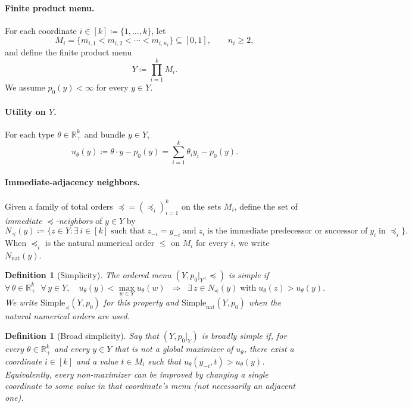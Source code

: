 \documentclass[11pt]{article}
\newtheorem{definition}[theorem]{Definition}
\newcommand{\R}{\mathbb{R}}
\newcommand{\Rp}{\R_+}
\newcommand{\Simplenat}{\mathrm{Simple}_{\mathrm{nat}}}
\newcommand{\Simpleord}{\mathrm{Simple}_{\preceq}}
\begin{document}
\paragraph{Finite product menu.}
For each coordinate $i \in [k] \coloneqq \{1,\dots,k\}$, let
\[
  M_i = \{m_{i,1} < m_{i,2} < \cdots < m_{i,n_i}\} \subseteq [0,1], \qquad n_i \geq 2,
\]
and define the finite product menu
\[
  Y \coloneqq \prod_{i=1}^k M_i.
\]
We assume $p_0(y) < \infty$ for every $y \in Y$.

\paragraph{Utility on $Y$.}
For each type $\theta \in \Rp^k$ and bundle $y \in Y$,
\[
  u_\theta(y) \coloneqq \theta \cdot y - p_0(y) = \sum_{i=1}^k \theta_i y_i - p_0(y).
\]

\paragraph{Immediate-adjacency neighbors.}
Given a family of total orders $\preceq = (\preceq_i)_{i=1}^k$ on the sets $M_i$,
define the set of \emph{immediate $\preceq$-neighbors} of $y \in Y$ by
\[
  N_{\preceq}(y) \coloneqq \bigl\{z \in Y : \exists\, i \in [k] \;\text{such that}\;
  z_{-i} = y_{-i} \;\text{and}\;
  z_i \;\text{is the immediate predecessor or successor of}\; y_i \;\text{in}\; \preceq_i\bigr\}.
\]
When $\preceq_i$ is the natural numerical order $\leq$ on $M_i$ for every $i$,
we write $N_{\mathrm{nat}}(y)$.

\begin{definition}[Simplicity]\label{def:simplicity}
The ordered menu $(Y, p_0|_Y, \preceq)$ is \emph{simple} if
\[
  \forall\, \theta \in \Rp^k\;\; \forall\, y \in Y, \quad
  u_\theta(y) < \max_{w \in Y} u_\theta(w) \;\;\Longrightarrow\;\;
  \exists\, z \in N_{\preceq}(y) \;\text{with}\; u_\theta(z) > u_\theta(y).
\]
We write $\Simpleord(Y, p_0)$ for this property and $\Simplenat(Y, p_0)$
when the natural numerical orders are used.
\end{definition}

\begin{definition}[Broad simplicity]\label{def:broad-simplicity}
Say that $(Y, p_0|_Y)$ is \emph{broadly simple} if, for every
$\theta \in \Rp^k$ and every $y \in Y$ that is not a global maximizer
of $u_\theta$, there exist a coordinate $i \in [k]$ and a value
$t \in M_i$ such that $u_\theta(y_{-i}, t) > u_\theta(y)$.
Equivalently, every non-maximizer can be improved by changing a single
coordinate to \emph{some} value in that coordinate's menu (not
necessarily an adjacent one).
\end{definition}
\end{document}
